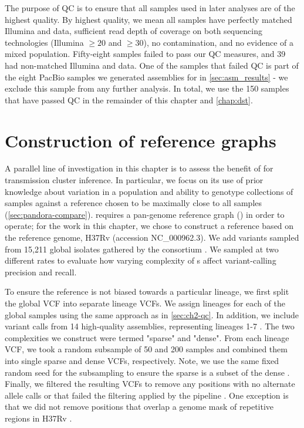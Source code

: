 The purpose of QC is to ensure that all samples used in later analyses are of the highest quality. By highest quality, we mean all samples have perfectly matched Illumina and \ont{} data, sufficient read depth of coverage on both sequencing technologies (Illumina $\ge 20$ and \ont{} $\ge 30$), no contamination, and no evidence of a mixed \mtb{} population. Fifty-eight samples failed to pass our QC measures, and 39 had non-matched Illumina and \ont{} data. One of the samples that failed QC is part of the eight PacBio samples we generated assemblies for in \autoref{sec:asm_results} - we exclude this sample from any further analysis. In total, we use the 150 samples that have passed QC in the remainder of this chapter and \autoref{chap:dst}.


\section{Construction of \mtb{} reference graphs}
\label{sec:tbprg}

A parallel line of investigation in this chapter is to assess the benefit of \pandora{} for \mtb{} transmission cluster inference. In particular, we focus on its use of prior knowledge about variation in a population and ability to genotype collections of samples against a reference chosen to be maximally close to all samples (\autoref{sec:pandora-compare}). \pandora{} requires a pan-genome reference graph (\panrg{}) in order to operate; for the work in this chapter, we chose to construct a reference \panrg{} based on the \mtb{} reference genome, H37Rv (accession NC\_000962.3). We add variants sampled from 15,211 global \mtb{} isolates gathered by the \cryptic{} consortium \cite{cryptic2021data}. We sampled at two different rates to evaluate how varying complexity of \panrg{}s affect variant-calling precision and recall.

To ensure the reference \panrg{} is not biased towards a particular lineage, we first split the global \cryptic{} VCF into separate lineage VCFs. We assign lineages for each of the global samples using the same approach as in \autoref{sec:ch2-qc}. In addition, we include variant calls from 14 high-quality \mtb{} assemblies, representing lineages 1-7 \cite{chiner2019,gramtools2021}. The two \panrg{} complexities we construct were termed "sparse" and "dense". From each lineage VCF, we took a random subsample of 50 and 200 samples and combined them into single sparse and dense VCFs, respectively. Note, we use the same fixed random seed for the subsampling to ensure the sparse \panrg{} is a subset of the dense \panrg{}. Finally, we filtered the resulting VCFs to remove any positions with no alternate allele calls or that failed the filtering applied by the \cryptic{} pipeline . One exception is that we did not remove positions that overlap a genome mask of repetitive regions in H37Rv \cite{tbmask2014}.  

